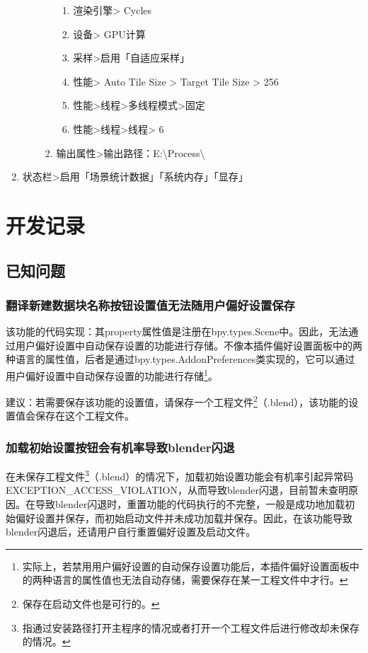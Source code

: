 \documentclass{../../PublicResources/DocClass}
\begin{document}
\begin{enumerate}
\begin{enumerate}
\begin{enumerate}
                              \begin{enumerate}
                                  \item 渲染引擎> Cycles
                                  \item 设备> GPU计算
                                  \item 采样>启用「自适应采样」
                                  \item 性能> Auto Tile Size > Target Tile Size > 256
                                  \item 性能>线程>多线程模式>固定
                                  \item 性能>线程>线程> 6
                              \end{enumerate}
                        \item 输出属性>输出路径：E:\textbackslash Process\textbackslash
                    \end{enumerate}
          \end{enumerate}
    \item 状态栏>启用「场景统计数据」「系统内存」「显存」
\end{enumerate}

\section{开发记录}
\subsection{已知问题}
\subsubsection{翻译新建数据块名称按钮设置值无法随用户偏好设置保存}
该功能的代码实现：其property属性值是注册在bpy.types.Scene中。因此，无法通过用户偏好设置中自动保存设置的功能进行存储。不像本插件偏好设置面板中的两种语言的属性值，后者是通过bpy.types.AddonPreferences类实现的，它可以通过用户偏好设置中自动保存设置的功能进行存储\footnote{实际上，若禁用用户偏好设置的自动保存设置功能后，本插件偏好设置面板中的两种语言的属性值也无法自动存储，需要保存在某一工程文件中才行。}。

建议：若需要保存该功能的设置值，请保存一个工程文件\footnote{保存在启动文件也是可行的。}（.blend），该功能的设置值会保存在这个工程文件。

\subsubsection{加载初始设置按钮会有机率导致blender闪退}
在未保存工程文件\footnote{指通过安装路径打开主程序的情况或者打开一个工程文件后进行修改却未保存的情况。}（.blend）的情况下，加载初始设置功能会有机率引起异常码EXCEPTION\_ACCESS\_VIOLATION，从而导致blender闪退，目前暂未查明原因。在导致blender闪退时，重置功能的代码执行的不完整，一般是成功地加载初始偏好设置并保存，而初始启动文件并未成功加载并保存。因此，在该功能导致blender闪退后，还请用户自行重置偏好设置及启动文件。
\end{document}
